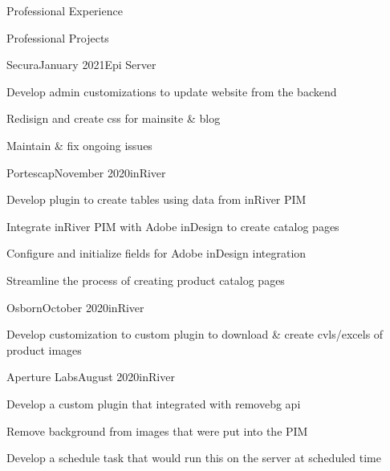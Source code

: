 \documentclass{resume} %
\begin{document}
\begin{rSection}{Professional Experience}

\end{rSection}

\begin{rSection}{Professional Projects}
    \begin{rSubsection}{Secura}{January 2021}{Epi Server}{}
        \item Develop admin customizations to update website from the backend 
        \item Redisign and create css for mainsite \& blog
        \item Maintain \& fix ongoing issues
    \end{rSubsection}

    \begin{rSubsection}{Portescap}{November 2020}{inRiver}{}
        \item Develop plugin to create tables using data from inRiver PIM
        \item Integrate inRiver PIM with Adobe inDesign to create catalog pages 
        \item Configure and initialize fields for Adobe inDesign integration
        \item Streamline the process of creating product catalog pages
    \end{rSubsection}

    \begin{rSubsection}{Osborn}{October 2020}{inRiver}{}
        \item Develop customization to custom plugin to download \& create cvls/excels of product images
    \end{rSubsection}

    \begin{rSubsection}{Aperture Labs}{August 2020}{inRiver}{}
        \item Develop a custom plugin that integrated with removebg api
        \item Remove background from images that were put into the PIM
        \item Develop a schedule task that would run this on the server at scheduled time
    \end{rSubsection}


\end{rSection}
\end{document}
